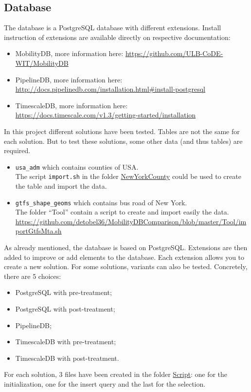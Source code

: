 \documentclass[a4paper,12pt]{article}
\begin{document}
    \subsection{Database}
        The database is a PostgreSQL database with different extensions. Install instruction of extensions are available directly on respective documentation:
        \begin{itemize}
            \item MobilityDB, more information here: \url{https://github.com/ULB-CoDE-WIT/MobilityDB}
            \item PipelineDB, more information here: \url{http://docs.pipelinedb.com/installation.html#install-postgresql}
            \item TimescaleDB, more information here: \url{https://docs.timescale.com/v1.3/getting-started/installation}
        \end{itemize}
        In this project different solutions have been tested. Tables are not the same for each solution. But to test these solutions, some other data (and thus tables) are required.
        \begin{itemize}
            \item \verb|usa_adm| which contains counties of USA.\\
                The script \verb|import.sh| in the folder \href{https://github.com/detobel36/MobilityDBComparison/tree/master/Tool/NewYorkCounty}{NewYorkCounty} could be used to create the table and import the data.
            \item \verb|gtfs_shape_geoms| which contains bus road of New York.\\
                The folder ``Tool'' contain a script to create and import easily the data. \url{https://github.com/detobel36/MobilityDBComparison/blob/master/Tool/importGtfsMta.sh}
        \end{itemize}
        
        As already mentioned, the database is based on PostgreSQL. Extensions are then added to improve or add elements to the database. Each extension allows you to create a new solution. For some solutions, variants can also be tested. Concretely, there are 5 choices:
        \begin{itemize}
            \item PostgreSQL with pre-treatment;
            \item PostgreSQL with post-treatment;
            \item PipelineDB;
            \item TimescaleDB with pre-treatment;
            \item TimescaleDB with post-treatment.
        \end{itemize}
        For each solution, 3 files have been created in the folder \href{https://github.com/detobel36/MobilityDBComparison/tree/master/Script}{Script}: one for the initialization, one for the insert query and the last for the selection.\\
        
\end{document}
